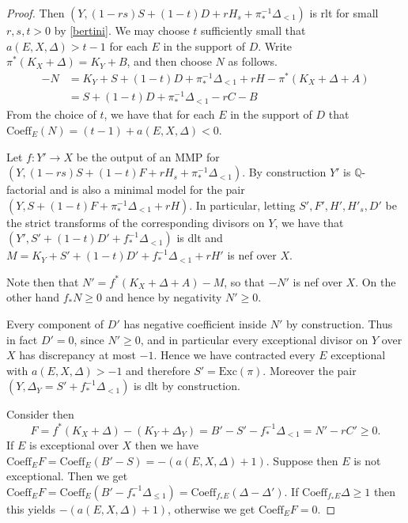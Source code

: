 \begin{proof}
	Then $(Y, (1-rs)S+(1-t)D+rH_{s}+\pi_{*}^{-1}\Delta_{<1})$ is rlt for small $r,s,t > 0$ by \autoref{bertini}. We may choose $t$ sufficiently small that $a(E,X,\Delta) > t-1$ for each $E$ in the support of $D$. Write $\pi^{*}(K_{X}+\Delta)=K_{Y}+B$, and then choose $N$ as follows.
	\begin{align*}
	-N&=K_{Y}+S+(1-t)D+\pi_{*}^{-1}\Delta_{<1}+rH-\pi^{*}(K_{X}+\Delta+A)\\
	&=S+(1-t)D+\pi_{*}^{-1}\Delta_{<1}-rC-B
	\end{align*}
	From the choice of $t$, we have that for each $E$ in the support of $D$ that $\text{Coeff}_{E}(N)=(t-1)+a(E,X,\Delta) < 0$.
	
	Let $f\colon Y' \to X$ be the output of an MMP for $(Y, (1-rs)S+(1-t)F+rH_{s}+\pi_{*}^{-1}\Delta_{<1})$. By construction $Y'$ is $\mathbb{Q}$-factorial and is also a minimal model for the pair $(Y,S+(1-t)F+\pi_{*}^{-1}\Delta_{<1}+rH)$. In particular, letting $S',F',H', H'_{s},D'$ be the strict transforms of the corresponding divisors on $Y$, we have that $(Y',S'+(1-t)D'+f_{*}^{-1}\Delta_{<1})$ is dlt and $M=K_{Y}+S'+(1-t)D'+f_{*}^{-1}\Delta_{<1}+rH'$ is nef over $X$.
	
	Note then that $N'=f^{*}(K_{X}+\Delta+A)-M$, so that $-N'$ is nef over $X$. On the other hand $f_{*}N \geq 0$ and hence by negativity $N' \geq 0$. 
	
 	Every component of $D'$ has negative coefficient inside $N'$ by construction. Thus in fact $D'=0$, since $N' \geq 0$, and in particular every exceptional divisor on $Y$ over $X$ has discrepancy at most $-1$. Hence we have contracted every $E$ exceptional with $a(E,X,\Delta) >-1$ and therefore $S'=\text{Exc}(\pi)$. Moreover the pair $(Y,\Delta_{Y}=S'+f_{*}^{-1}\Delta_{<1})$ is dlt by construction. 
 	
 	Consider then $$F=f^{*}(K_{X}+\Delta)-(K_{Y}+\Delta_{Y})=B'-S'-f_{*}^{-1}\Delta_{<1}=N'-rC' \geq 0.$$ If $E$ is exceptional over $X$ then we have $\text{Coeff}_{E}F=\text{Coeff}_{E}(B'-S)=-(a(E,X,\Delta)+1)$. Suppose then $E$ is not exceptional. Then we get $\text{Coeff}_{E}F=\text{Coeff}_{E}(B'-f_{*}^{-1}\Delta_{\leq1})=\text{Coeff}_{f_{*}E}(\Delta-\Delta')$. If $\text{Coeff}_{f_{*}E}\Delta \geq 1$ then this yields $-(a(E,X,\Delta)+1)$, otherwise we get $\text{Coeff}_{E}F=0$.

 	
%
% 	
	

\end{proof}
